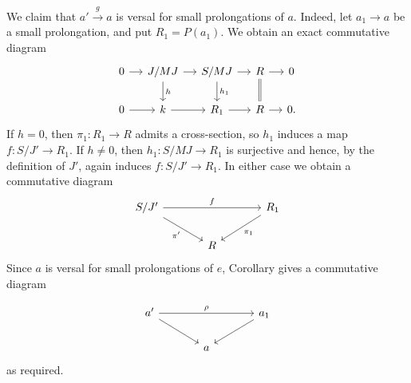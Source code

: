 We claim that $a'\xrightarrow g a$ is versal for small prolongations
of $a$. Indeed, let $a_1\longrightarrow a$ be a small prolongation,
and put $R_1=P(a_1)$. We obtain an exact commutative diagram
\[
\begin{tikzcd}[column sep=small]
0 \arrow[r] & J/MJ \arrow[r] \arrow[d,"h"]
 & S/MJ \arrow[r] \arrow[d,"h_1"]
 & R \arrow[r] \arrow[d,equal] & 0 \\
0 \arrow[r] & k \arrow[r] & R_1 \arrow[r] & R \arrow[r] & 0.
\end{tikzcd}
\]
If $h=0$, then $\pi_1:R_1\longrightarrow R$ admits a cross-section,
so $h_1$ induces a map $f:S/J'\longrightarrow R_1$. If $h\ne0$,
then $h_1:S/MJ\longrightarrow R_1$ is surjective and hence, by the
definition of $J'$, again induces $f:S/J'\longrightarrow R_1$.
In either case we obtain a commutative diagram
\[
\begin{tikzcd}[column sep=large]
S/J' \arrow[rr,"f"] \arrow[dr,"\pi'"']
 & & R_1 \arrow[dl,"\pi_1"] \\
& R &
\end{tikzcd}
\]
Since $a$ is versal for small prolongations of $e$, Corollary 
gives a commutative diagram


\[
\begin{tikzcd}[column sep=large]
a' \arrow[rr,"\rho"] \arrow[dr] & & a_1 \arrow[dl] \\
& a &
\end{tikzcd}
\]
as required.

